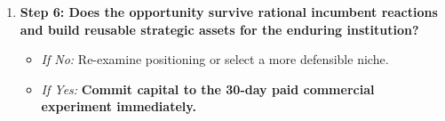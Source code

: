 \begin{enumerate}[leftmargin=14pt,itemsep=3pt,topsep=2pt]
  \item \textbf{Step 6: Does the opportunity survive rational incumbent reactions and build reusable strategic assets for the enduring institution?}
  \begin{itemize}[leftmargin=10pt,itemsep=1pt]
    \item \textit{If No:} Re-examine positioning or select a more defensible niche.
    \item \textit{If Yes:} \textbf{Commit capital to the 30-day paid commercial experiment immediately.}
  \end{itemize}
\end{enumerate}
